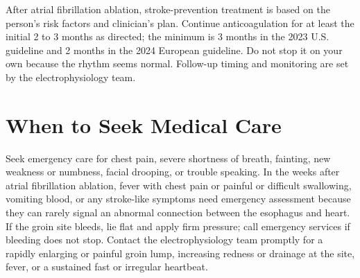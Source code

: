 After atrial fibrillation ablation, stroke-prevention treatment is based on the person's risk factors and clinician's plan. Continue anticoagulation for at least the initial 2 to 3 months as directed; the minimum is 3 months in the 2023 U.S. guideline and 2 months in the 2024 European guideline. Do not stop it on your own because the rhythm seems normal. Follow-up timing and monitoring are set by the electrophysiology team.

\section*{When to Seek Medical Care}
Seek emergency care for chest pain, severe shortness of breath, fainting, new weakness or numbness, facial drooping, or trouble speaking. In the weeks after atrial fibrillation ablation, fever with chest pain or painful or difficult swallowing, vomiting blood, or any stroke-like symptoms need emergency assessment because they can rarely signal an abnormal connection between the esophagus and heart. If the groin site bleeds, lie flat and apply firm pressure; call emergency services if bleeding does not stop. Contact the electrophysiology team promptly for a rapidly enlarging or painful groin lump, increasing redness or drainage at the site, fever, or a sustained fast or irregular heartbeat.

